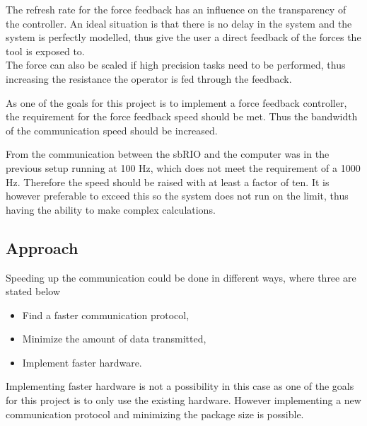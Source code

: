 
The refresh rate for the force feedback has an influence on the transparency of the controller. An ideal situation is that there is no delay in the system and the system is perfectly modelled, thus give the user a direct feedback of the forces the tool is exposed to.\\ 
The force can also be scaled if high precision tasks need to be performed, thus increasing the resistance the operator is fed through the feedback.



As one of the goals for this project is to implement a force feedback controller, the requirement for the force feedback speed should be met. Thus the bandwidth of the communication speed should be increased.


From  the communication between the sbRIO and the computer was in the previous setup running at 100 Hz, which does not meet the requirement of a 1000 Hz. Therefore the speed should be raised with at least a factor of ten. It is however preferable to exceed this so the system does not run on the limit, thus having the ability to make complex calculations.


\subsection*{Approach}
Speeding up the communication could be done in different ways, where three are stated below

\begin{itemize}
	\item Find a faster communication protocol,
	\item Minimize the amount of data transmitted,
	\item Implement faster hardware.	
\end{itemize}

Implementing faster hardware is not a possibility in this case as one of the goals for this project is to only use the existing hardware.
However implementing a new communication protocol and minimizing the package size is possible.\\
